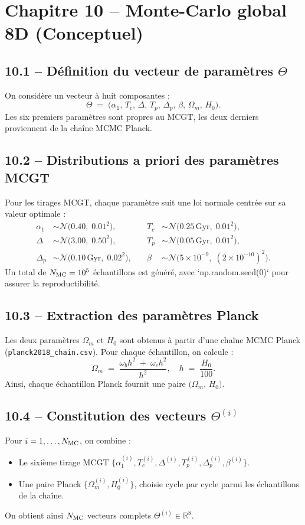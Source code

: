\section{Chapitre 10 – Monte-Carlo global 8D (Conceptuel)}

\subsection{10.1 – Définition du vecteur de paramètres \(\Theta\)}
On considère un vecteur à huit composantes :
\[
  \Theta \;=\;
  \bigl(\alpha_{1},\,T_{c},\,\Delta,\,T_{p},\,\Delta_{p},\,\beta,\,
           \Omega_{m},\,H_{0}\bigr).
\]
Les six premiers paramètres sont propres au MCGT, les deux derniers proviennent de la chaîne MCMC Planck.

\subsection{10.2 – Distributions a priori des paramètres MCGT}
Pour les tirages MCGT, chaque paramètre suit une loi normale centrée sur sa valeur optimale :
\[
  \begin{aligned}
    \alpha_{1} &\sim \mathcal{N}\bigl(0.40,\;0.01^{2}\bigr),
    &\quad
    T_{c} &\sim \mathcal{N}\bigl(0.25\,\text{Gyr},\;0.01^{2}\bigr), \\
    \Delta &\sim \mathcal{N}\bigl(3.00,\;0.50^{2}\bigr),
    &\quad
    T_{p} &\sim \mathcal{N}\bigl(0.05\,\text{Gyr},\;0.01^{2}\bigr), \\
    \Delta_{p} &\sim \mathcal{N}\bigl(0.10\,\text{Gyr},\;0.02^{2}\bigr),
    &\quad
    \beta &\sim \mathcal{N}\bigl(5\times10^{-9},\;(2\times10^{-10})^{2}\bigr).
  \end{aligned}
\]
Un total de \(N_{\rm MC}=10^{5}\) échantillons est généré, avec `np.random.seed(0)` pour assurer la reproductibilité.

\subsection{10.3 – Extraction des paramètres Planck}
Les deux paramètres \(\Omega_{m}\) et \(H_{0}\) sont obtenus à partir d’une chaîne MCMC Planck (\texttt{planck2018\_chain.csv}). Pour chaque échantillon, on calcule :
\[
  \Omega_{m} \;=\; \frac{\omega_{b} h^{2} \;+\;\omega_{c} h^{2}}{h^{2}},
  \quad
  h \;=\; \frac{H_{0}}{100}.
\]
Ainsi, chaque échantillon Planck fournit une paire \(\bigl(\Omega_{m},\,H_{0}\bigr)\).

\subsection{10.4 – Constitution des vecteurs \(\Theta^{(i)}\)}
Pour \(i=1,\dots,N_{\rm MC}\), on combine :
\begin{itemize}
  \item Le sixième tirage MCGT \(\{\alpha_{1}^{(i)},T_{c}^{(i)},\Delta^{(i)},T_{p}^{(i)},\Delta_{p}^{(i)},\beta^{(i)}\}\).
  \item Une paire Planck \(\{\Omega_{m}^{(i)},H_{0}^{(i)}\}\), choisie cycle par cycle parmi les échantillons de la chaîne.
\end{itemize}
On obtient ainsi \(N_{\rm MC}\) vecteurs complets \(\Theta^{(i)} \in \mathbb{R}^{8}\).


